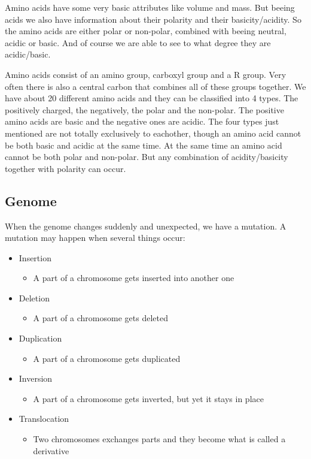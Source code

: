 Amino acids have some very basic attributes like volume and mass. But beeing
acids we also have information about their polarity and their basicity/acidity.
So the amino acids are either polar or non-polar, combined with beeing neutral,
acidic or basic. And of course we are able to see to what degree they are
acidic/basic.

Amino acids consist of an amino group, carboxyl group and a R group. Very often
there is also a central carbon that combines all of these groups together. We
have about 20 different amino acids and they can be classified into 4 types.
The positively charged, the negatively, the polar and the non-polar. The
positive amino acids are basic and the negative ones are acidic. The four types
just mentioned are not totally exclusively to eachother, though an amino acid
cannot be both basic and acidic at the same time. At the same time an amino acid
cannot be both polar and non-polar. But any combination of acidity/basicity
together with polarity can occur.
\subsection*{Genome}
When the genome changes suddenly and unexpected, we have a mutation. A mutation
may happen when several things occur:
\begin{itemize}
    \item Insertion
        \begin{itemize}
            \item A part of a chromosome gets inserted into another one
        \end{itemize}
    \item Deletion
        \begin{itemize}
            \item A part of a chromosome gets deleted
        \end{itemize}
    \item Duplication
        \begin{itemize}
            \item A part of a chromosome gets duplicated
        \end{itemize}
    \item Inversion
        \begin{itemize}
            \item A part of a chromosome gets inverted, but yet it stays in
                place
        \end{itemize}
    \item Translocation
        \begin{itemize}
            \item Two chromosomes exchanges parts and they become what is called
                a derivative
        \end{itemize}
\end{itemize}
